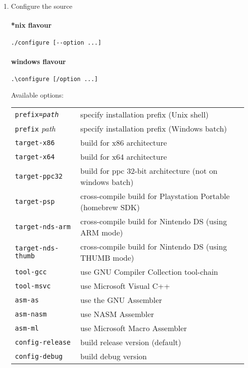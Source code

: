 \begin{enumerate}
\item Configure the source

\paragraph{*nix flavour}
\begin{lstlisting}
./configure [--option ...]
\end{lstlisting}

\paragraph{windows flavour}

\begin{lstlisting}
.\configure [/option ...]
\end{lstlisting}

Available options:

\begin{tabular}{ll}	
{\tt prefix={\it path}} & specify installation prefix (Unix shell) \\
{\tt prefix} {\it path} & specify installation prefix (Windows batch) \\
{\tt target-x86}        & build for x86 architecture \\
{\tt target-x64}        & build for x64 architecture \\
{\tt target-ppc32}      & build for ppc 32-bit architecture (not on windows batch)\\
{\tt target-psp}        & cross-compile build for Playstation Portable (homebrew SDK)\\
{\tt target-nds-arm}    & cross-compile build for Nintendo DS (using ARM mode) \\
{\tt target-nds-thumb}  & cross-compile build for Nintendo DS (using THUMB mode) \\
{\tt tool-gcc}          & use GNU Compiler Collection tool-chain \\
{\tt tool-msvc}         & use Microsoft Visual C++ \\
{\tt asm-as}            & use the GNU Assembler \\
{\tt asm-nasm}          & use NASM Assembler \\
{\tt asm-ml}            & use Microsoft Macro Assembler \\
{\tt config-release}    & build release version (default) \\
{\tt config-debug}      & build debug version \\
\end{tabular}


\end{enumerate}
